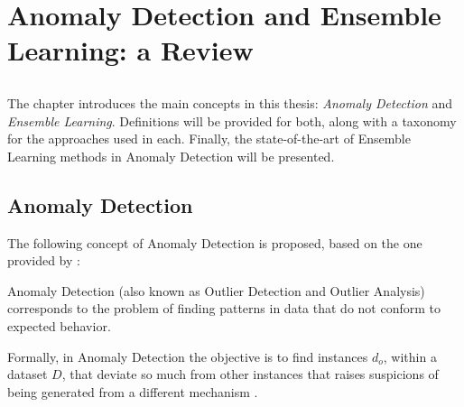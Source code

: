 \chapter{Anomaly Detection and Ensemble Learning: a Review} \label{chap:sota}

\section*{}

The chapter introduces the main concepts in this thesis: \textit{Anomaly Detection} and \textit{Ensemble Learning}. Definitions will be provided for both, along with a taxonomy for the approaches used in each. Finally, the state-of-the-art of Ensemble Learning methods in Anomaly Detection will be presented.

\section{Anomaly Detection}\label{sec:anomaly}

The following concept of Anomaly Detection is proposed, based on the one provided by \textcite{Kandhari2009}:

\begin{definition}
	Anomaly Detection (also known as Outlier Detection and Outlier Analysis) corresponds to the problem of finding patterns in data that do not conform to expected behavior.
\end{definition}

Formally, in Anomaly Detection the objective is to find instances $d_o$, within a dataset $D$, that deviate so much from other instances that raises suspicions of being generated from a different mechanism \cite{hawkins1980identification}.


